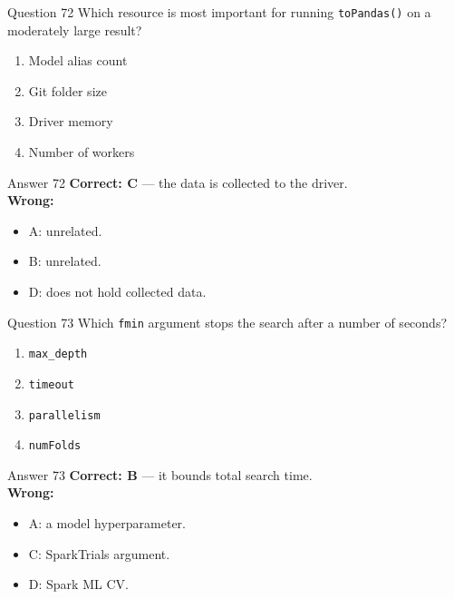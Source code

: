 \documentclass[aspectratio=169,11pt]{beamer}
\begin{document}
\begin{frame}{Question 72}
Which resource is most important for running \texttt{toPandas()} on a moderately large result?
\begin{enumerate}[label=\Alph*.]
\item Model alias count
\item Git folder size
\item Driver memory
\item Number of workers
\end{enumerate}
\end{frame}
\begin{frame}{Answer 72}
\textbf{Correct: C} --- the data is collected to the driver.\\
\vspace{0.5em}
\textbf{Wrong:}
\begin{itemize}
\item A: unrelated.
\item B: unrelated.
\item D: does not hold collected data.
\end{itemize}
\end{frame}

\begin{frame}{Question 73}
Which \texttt{fmin} argument stops the search after a number of seconds?
\begin{enumerate}[label=\Alph*.]
\item \texttt{max\_depth}
\item \texttt{timeout}
\item \texttt{parallelism}
\item \texttt{numFolds}
\end{enumerate}
\end{frame}
\begin{frame}{Answer 73}
\textbf{Correct: B} --- it bounds total search time.\\
\vspace{0.5em}
\textbf{Wrong:}
\begin{itemize}
\item A: a model hyperparameter.
\item C: SparkTrials argument.
\item D: Spark ML CV.
\end{itemize}
\end{frame}
\end{document}
